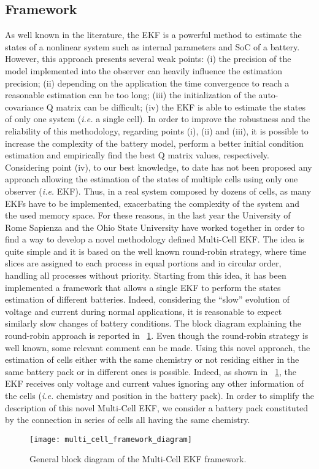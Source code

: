 \documentclass[journal]{IEEEtran}
\begin{document}
\subsection{Framework}
\label{sec::multi_cell_ekf_framework}

As well known in  the literature, the EKF is a powerful method to estimate the states of a nonlinear system such as internal parameters and SoC of a battery. 
However, this approach presents several weak points:
(i) the precision of the model implemented into the observer can heavily influence the estimation precision; (ii) depending on the application the time convergence to reach a reasonable estimation can be too long; (iii) the initialization of the auto-covariance Q matrix can be difficult; (iv) the EKF is able to estimate the states of only one system (\textit{i.e.} a single cell). 
In order to improve the robustness and the reliability of this methodology, regarding points (i), (ii) and (iii), it is possible to increase the complexity of the battery model, perform a better initial condition estimation and empirically find the best Q matrix values, respectively.
Considering point (iv), to our best knowledge, to date has not been proposed any approach allowing the estimation of the states of multiple cells using only one observer (\textit{i.e.} EKF).
Thus, in a real system composed by dozens of cells, as many EKFs have to be implemented, exacerbating the complexity of the system and the used memory space.
For these reasons, in the last year the University of Rome Sapienza and the Ohio State University have worked together in order to find a way to develop a novel methodology defined Multi-Cell EKF.
The idea is quite simple and it is based on the well known round-robin strategy, where time slices are assigned to each process in equal portions and in circular order, handling all processes without priority.
Starting from this idea, it has been implemented a framework that allows a single EKF to perform the states estimation of different batteries.
Indeed, considering the ``slow'' evolution of voltage and current during normal applications, it is reasonable to expect similarly slow changes of battery conditions.
The block diagram explaining the round-robin approach is reported in \figurename~\ref{fig::multi_cell_framework_diagram}.
Even though the round-robin strategy is well known, some relevant comment can be made.
Using this novel approach, the estimation of cells either with the same chemistry or not residing either in the same battery pack or in different ones is possible.
Indeed, as shown in \figurename~\ref{fig::multi_cell_framework_diagram}, the EKF receives only voltage and current values ignoring any other information of the cells (\textit{i.e.} chemistry and position in the battery pack).
In order to simplify the description of this novel Multi-Cell EKF, we consider a battery pack constituted by the connection in series of cells all having the same chemistry.
\begin{figure}[!htbp]
	\centering
		\texttt{[image: multi\_cell\_framework\_diagram]}
	\caption{General block diagram of the Multi-Cell EKF framework.}
	\label{fig::multi_cell_framework_diagram}
\end{figure}
\end{document}
